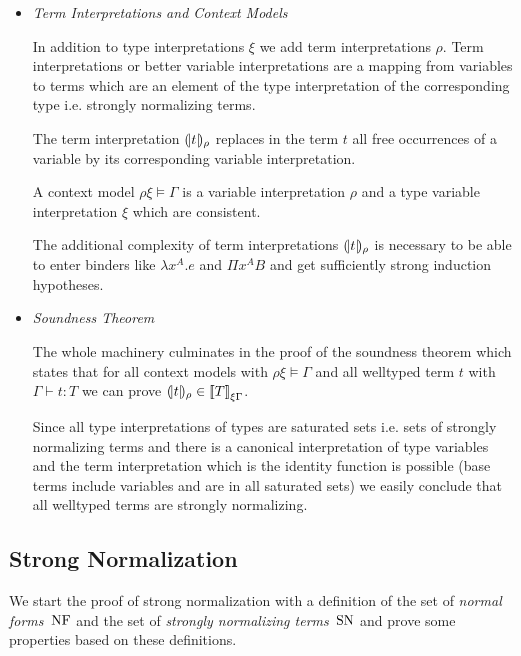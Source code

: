 \begin{itemize}
    \item \emph{Term Interpretations and Context Models}

        In addition to type interpretations $\xi$ we add term interpretations
        $\rho$. Term interpretations or better variable interpretations are
        a mapping from variables to terms which are an element of the type
        interpretation of the corresponding type i.e. strongly normalizing
        terms.

        The term interpretation ${(\!|t|\!)_{\rho}}$ replaces in the term $t$
        all free occurrences of a variable by its corresponding variable
        interpretation.

        A context model $\rho\xi \vDash \Gamma$ is a variable
        interpretation $\rho$ and a type variable interpretation $\xi$ which are
        consistent.

        The additional complexity of term interpretations ${(\!|t|\!)_{\rho}}$ is
        necessary to be able to enter binders like $\lambda x^A. e$ and $\Pi x^A
        B$ and get sufficiently strong induction hypotheses.

    \item \emph{Soundness Theorem}

        The whole machinery culminates in the proof of the soundness theorem
        which states that for all context models with $\rho\xi \vDash \Gamma$
        and all welltyped term $t$ with $\Gamma \vdash t : T$ we
        can prove ${(\!|t|\!)_{\rho}} \in {{{[\![}T {]\!]}}_{\xi\Gamma}}$.

        Since all type interpretations of types are saturated sets i.e. sets of
        strongly normalizing terms and there is a canonical interpretation of
        type variables and the term interpretation which is the identity
        function is possible (base terms include variables and are in all
        saturated sets) we easily conclude that all welltyped terms are strongly
        normalizing.
\end{itemize}





\subsection{Strong Normalization}

We start the proof of strong normalization with a definition of the set of
\emph{normal forms} $\text{NF}$ and the set of \emph{strongly normalizing terms} $\text{SN}$
and prove some properties based on these definitions.


